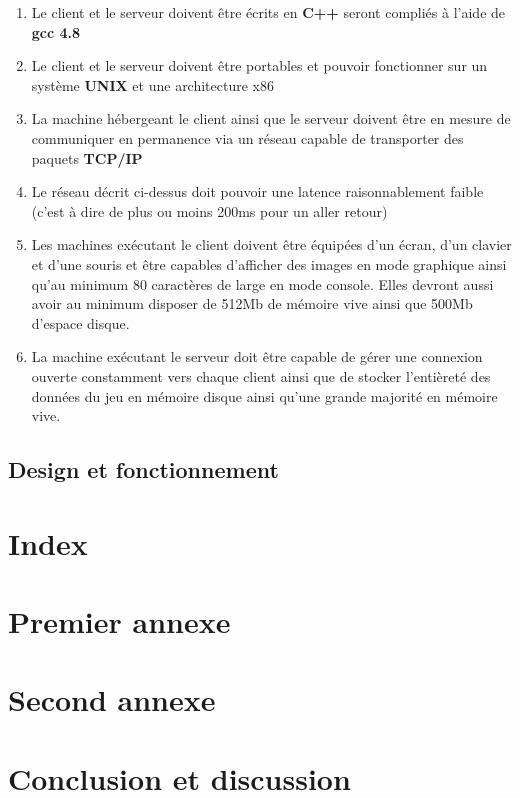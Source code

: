 \documentclass[a4paper]{article}
\begin{document}
\begin{enumerate}
\item Le client et le serveur doivent être écrits en \textbf{C++} seront compliés à l'aide de \textbf{gcc 4.8}
\item Le client et le serveur doivent être portables et pouvoir fonctionner sur un système \textbf{UNIX} et une architecture x86
\item La machine hébergeant le client ainsi que le serveur doivent être en mesure de communiquer en permanence via un réseau capable de transporter des paquets \textbf{TCP/IP}
\item Le réseau décrit ci-dessus doit pouvoir une latence raisonnablement faible (c'est à dire de plus ou moins 200ms pour un aller retour)
\item Les machines exécutant le client doivent être équipées d'un écran, d'un clavier et d'une souris et être capables d'afficher des images en mode graphique ainsi qu'au minimum 80 caractères de large en mode console. Elles devront aussi avoir au minimum disposer de 512Mb de mémoire vive ainsi que 500Mb d'espace disque.
\item La machine exécutant le serveur doit être capable de gérer une connexion ouverte constamment vers chaque client ainsi que de stocker l'entièreté des données du jeu en mémoire disque ainsi qu'une grande majorité en mémoire vive.
\end{enumerate}


\subsection{Design et fonctionnement}
\section{Index}

\appendix

\section{Premier annexe}
\section{Second annexe}

\section{Conclusion et discussion}

\tableofcontents    %
\listoffigures        %
\listoftables        %

\end{document}
